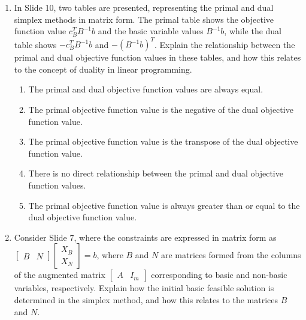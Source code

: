 \documentclass{article}%
\begin{document}
\begin{enumerate}
\begin{enumerate}%
\item If any element of $\bar{C}$ is positive, the solution is optimal.%
\item If all elements of $\bar{C}$ are zero, the solution is optimal.%
\item If any element of $\bar{C}$ is negative, the solution is optimal.%
\item If all elements of $\bar{C}$ are positive, the solution is optimal.%
\item If all elements of $\bar{C}$ are negative, the solution is optimal.%
\end{enumerate}%
\vspace{1em}%
\item In Slide 10, two tables are presented, representing the primal and dual simplex methods in matrix form. The primal table shows the objective function value $c_B^T B^{-1} b$ and the basic variable values $B^{-1} b$, while the dual table shows $-c_B^T B^{-1} b$ and $-(B^{-1}b)^T$.  Explain the relationship between the primal and dual objective function values in these tables, and how this relates to the concept of duality in linear programming.%
\begin{enumerate}%
\item The primal and dual objective function values are always equal.%
\item The primal objective function value is the negative of the dual objective function value.%
\item The primal objective function value is the transpose of the dual objective function value.%
\item There is no direct relationship between the primal and dual objective function values.%
\item The primal objective function value is always greater than or equal to the dual objective function value.%
\end{enumerate}%
\vspace{1em}%
\item Consider Slide 7, where the constraints are expressed in matrix form as $\begin{bmatrix} B & N \end{bmatrix} \begin{bmatrix} X_B \\ X_N \end{bmatrix} = b$, where $B$ and $N$ are matrices formed from the columns of the augmented matrix $\begin{bmatrix} A & I_m \end{bmatrix}$ corresponding to basic and non-basic variables, respectively.  Explain how the initial basic feasible solution is determined in the simplex method, and how this relates to the matrices $B$ and $N$.%

\end{enumerate}
\end{document}
